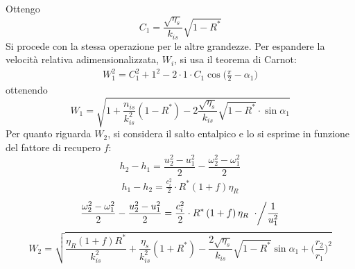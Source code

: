 Ottengo
\begin{equation}
\boxed{ C_1 = \frac{\sqrt{\eta_s}}{k_{is}} \sqrt{1 - R^*} }
\end{equation}
Si procede con la stessa operazione per le altre grandezze. Per espandere la velocità relativa adimensionalizzata, $W_i$, si usa il teorema di Carnot:
\begin{align*}
W_1^2 = C_1^2 + 1^2 - 2 \cdot 1 \cdot C_1 \cos \big( \frac{\pi}{2} - \alpha_1 \big)
\end{align*}
ottenendo
\begin{equation}
\boxed{ W_1 = \sqrt{1 + \frac{n_{is}}{k_{is}^2} \left( 1 - R^* \right) - 2 \frac{\sqrt{\eta_s}}{k_{is}} \sqrt{1-R^*} \cdot \sin \alpha_1}}
\label{eq:W1}
\end{equation}
Per quanto riguarda $W_2$, si considera il salto entalpico e lo si esprime in funzione del fattore di recupero $f$:
\begin{equation}
h_2 - h_1 = \frac{u_2^2 - u_1^2}{2} - \frac{\omega_2^2 - \omega_1^2}{2}
\end{equation}
\begin{align*}
h_1 - h_2 = \frac{c_i^2}{2} \cdot R^* \left( 1 + f \right) \eta_R
\end{align*}
\begin{align*}
\left. \frac{\omega_2^2 - \omega_1^2}{2} - \frac{u_2^2 - u_1^2}{2} = \frac{c_i^2}{2} \cdot R^* \left( 1 + f \right) \eta_R \; \; \cdot \middle/ \frac{1}{u_1^2} \right.
\end{align*}
\begin{equation}
\boxed{W_2 = \sqrt{\frac{\eta_R \left( 1 + f \right) R^*}{k_{is}^2} + \frac{\eta_s}{k_{is}^2}  \left(1 + R^* \right) - \frac{2 \sqrt{\eta_s}}{k_{is}} \sqrt{1 - R^*} \sin \alpha_1 + \bigg(\frac{r_2}{r_1} \bigg)^2 } }
\end{equation}

